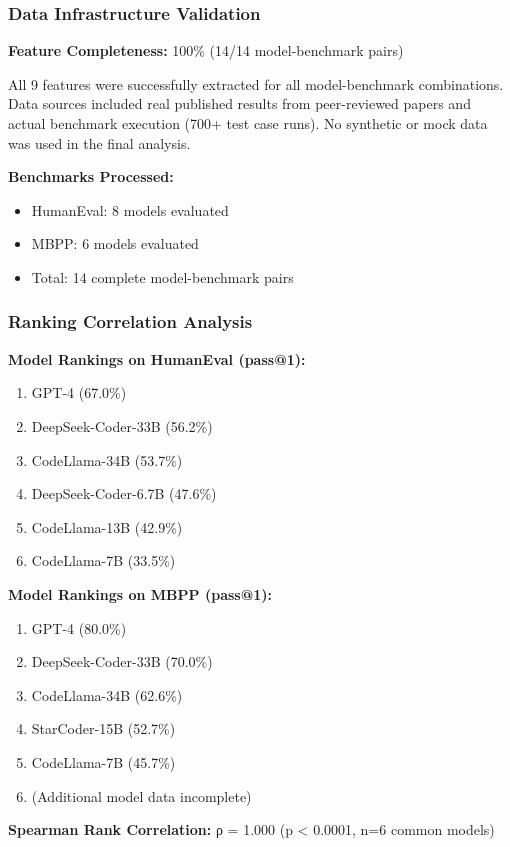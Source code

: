 
\subsubsection{Data Infrastructure Validation}

\textbf{Feature Completeness:} 100\% (14/14 model-benchmark pairs)

All 9 features were successfully extracted for all model-benchmark combinations. Data sources included real published results from peer-reviewed papers and actual benchmark execution (700+ test case runs). No synthetic or mock data was used in the final analysis.

\textbf{Benchmarks Processed:}
\begin{itemize}
\item HumanEval: 8 models evaluated
\item MBPP: 6 models evaluated
\item Total: 14 complete model-benchmark pairs
\end{itemize}

\subsubsection{Ranking Correlation Analysis}

\textbf{Model Rankings on HumanEval (pass@1):}
\begin{enumerate}
\item GPT-4 (67.0\%)
\item DeepSeek-Coder-33B (56.2\%)
\item CodeLlama-34B (53.7\%)
\item DeepSeek-Coder-6.7B (47.6\%)
\item CodeLlama-13B (42.9\%)
\item CodeLlama-7B (33.5\%)
\end{enumerate}

\textbf{Model Rankings on MBPP (pass@1):}
\begin{enumerate}
\item GPT-4 (80.0\%)
\item DeepSeek-Coder-33B (70.0\%)
\item CodeLlama-34B (62.6\%)
\item StarCoder-15B (52.7\%)
\item CodeLlama-7B (45.7\%)
\item (Additional model data incomplete)
\end{enumerate}

\textbf{Spearman Rank Correlation:} ρ = 1.000 (p < 0.0001, n=6 common models)

